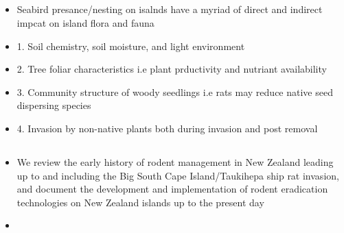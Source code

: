 \documentclass[document.tex]{subfiles}
\begin{document}
    \subsection{}
    \begin{itemize}
    \item Seabird presance/nesting on isalnds have a myriad of direct and indirect impcat on island flora and fauna 
    \item 1. Soil chemistry, soil moisture, and light environment
    \item 2. Tree foliar characteristics i.e plant prductivity and nutriant availability
    \item 3. Community structure of woody seedlings i.e rats may reduce native seed dispersing species
    \item 4. Invasion by non-native plants both during invasion and post removal
    \end{itemize}


    \subsection{}
    \begin{itemize}
    \item We review the early history of rodent management in New Zealand leading
    up to and including the Big South Cape Island/Taukihepa ship rat invasion, and document the development
    and implementation of rodent eradication technologies on New Zealand islands up to the present day
    \item 
    \end{itemize}

\bib{}
    
\end{document}
